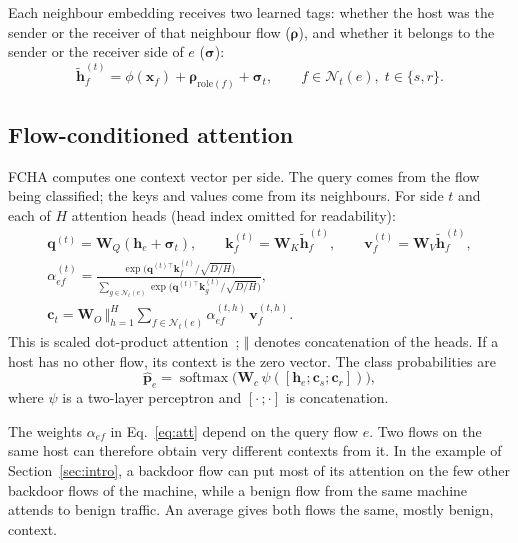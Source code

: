 \documentclass[pdflatex,sn-mathphys-num]{sn-jnl}
\begin{document}
Each neighbour embedding receives two learned tags: whether the host was the sender or the receiver of that neighbour flow ($\boldsymbol{\rho}$), and whether it belongs to the sender or the receiver side of $e$ ($\boldsymbol{\sigma}$):
\begin{equation}
\tilde{\mathbf{h}}^{(t)}_f=\phi(\mathbf{x}_f)+\boldsymbol{\rho}_{\mathrm{role}(f)}+\boldsymbol{\sigma}_t,\qquad f\in\mathcal{N}_t(e),\; t\in\{s,r\}.\label{eq:tag}
\end{equation}

\subsection{Flow-conditioned attention}\label{sec:attention}

FCHA computes one context vector per side. The query comes from the flow being classified; the keys and values come from its neighbours. For side $t$ and each of $H$ attention heads (head index omitted for readability):
\begin{gather}
\mathbf{q}^{(t)} = \mathbf{W}_Q(\mathbf{h}_e+\boldsymbol{\sigma}_t),\qquad
\mathbf{k}^{(t)}_f = \mathbf{W}_K\tilde{\mathbf{h}}^{(t)}_f,\qquad
\mathbf{v}^{(t)}_f = \mathbf{W}_V\tilde{\mathbf{h}}^{(t)}_f, \label{eq:qkv}\\
\alpha^{(t)}_{ef} = \frac{\exp\!\big(\mathbf{q}^{(t)\top}\mathbf{k}^{(t)}_f/\sqrt{D/H}\big)}{\sum_{g\in\mathcal{N}_t(e)}\exp\!\big(\mathbf{q}^{(t)\top}\mathbf{k}^{(t)}_g/\sqrt{D/H}\big)}, \label{eq:att}\\
\mathbf{c}_t = \mathbf{W}_O\,\big\Vert_{h=1}^{H}\sum_{f\in\mathcal{N}_t(e)}\alpha^{(t,h)}_{ef}\,\mathbf{v}^{(t,h)}_f. \label{eq:ctx}
\end{gather}
This is scaled dot-product attention~\cite{vaswani2017attention}; $\Vert$ denotes concatenation of the heads. If a host has no other flow, its context is the zero vector. The class probabilities are
\begin{equation}
\hat{\mathbf{p}}_e=\operatorname{softmax}\!\big(\mathbf{W}_c\,\psi([\mathbf{h}_e;\mathbf{c}_s;\mathbf{c}_r])\big),\label{eq:out}
\end{equation}
where $\psi$ is a two-layer perceptron and $[\cdot\,;\cdot]$ is concatenation.

The weights $\alpha_{ef}$ in Eq.~\eqref{eq:att} depend on the query flow $e$. Two flows on the same host can therefore obtain very different contexts from it. In the example of Section~\ref{sec:intro}, a backdoor flow can put most of its attention on the few other backdoor flows of the machine, while a benign flow from the same machine attends to benign traffic. An average gives both flows the same, mostly benign, context.
\end{document}

